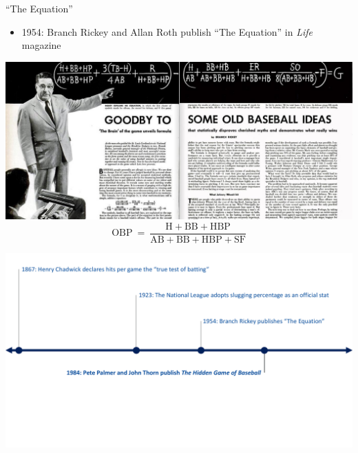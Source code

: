 \documentclass[handout]{beamer}
\begin{document}
\begin{frame}{``The Equation''}
  \begin{itemize}
    \item 1954: Branch Rickey and Allan Roth publish ``The Equation'' in {\it Life} magazine
  \end{itemize}
  \includegraphics[width = \textwidth]{images/the_equation.jpg}
  $$
    \mbox{OBP}~=~\frac{\mbox{H} + \mbox{BB} + \mbox{HBP}}{\mbox{AB} + \mbox{BB} + \mbox{HBP} + \mbox{SF}}
  $$
\end{frame}

\begin{frame}
  \includegraphics[width = \textwidth]{figures/timeline_1984.pdf}
\end{frame}
\end{document}
